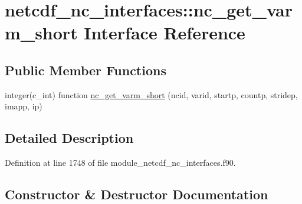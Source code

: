 \hypertarget{interfacenetcdf__nc__interfaces_1_1nc__get__varm__short}{}\section{netcdf\+\_\+nc\+\_\+interfaces\+:\+:nc\+\_\+get\+\_\+varm\+\_\+short Interface Reference}
\label{interfacenetcdf__nc__interfaces_1_1nc__get__varm__short}
\subsection*{Public Member Functions}
\begin{DoxyCompactItemize}
\item 
integer(c\+\_\+int) function \hyperlink{interfacenetcdf__nc__interfaces_1_1nc__get__varm__short_a7f85661b595e0185dafb9cb1a195de3d}{nc\+\_\+get\+\_\+varm\+\_\+short} (ncid, varid, startp, countp, stridep, imapp, ip)
\end{DoxyCompactItemize}


\subsection{Detailed Description}


Definition at line 1748 of file module\+\_\+netcdf\+\_\+nc\+\_\+interfaces.\+f90.



\subsection{Constructor \& Destructor Documentation}
\mbox{\label{interfacenetcdf__nc__interfaces_1_1nc__get__varm__short_a7f85661b595e0185dafb9cb1a195de3d}} 
